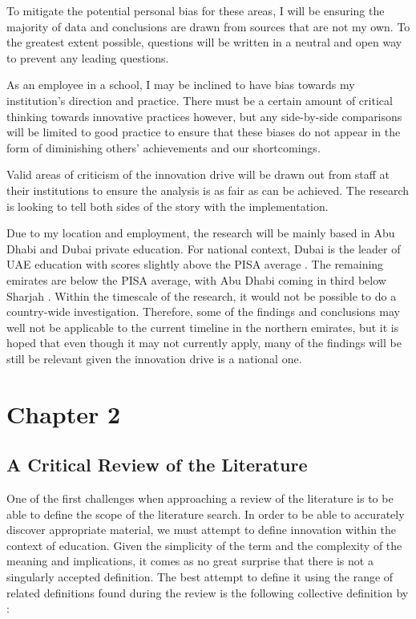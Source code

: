 \documentclass[11pt]{article}
\begin{document}
To mitigate the potential personal bias for these areas, I will be ensuring the majority of data and conclusions are drawn from sources that are not my own. To the greatest extent possible, questions will be written in a neutral and open way to prevent any leading questions.

As an employee in a school, I may be inclined to have bias towards my institution's direction and practice. There must be a certain amount of critical thinking towards innovative practices however, but any side-by-side comparisons will be limited to good practice to ensure that these biases do not appear in the form of diminishing others’ achievements and our shortcomings. 

Valid areas of criticism of the innovation drive will be drawn out from staff at their institutions to ensure the analysis is as fair as can be achieved. The research is looking to tell both sides of the story with the implementation.

Due to my location and employment, the research will be mainly based in Abu Dhabi and Dubai private education. For national context, Dubai is the leader of UAE education with scores slightly above the PISA average \citep{2013}. The remaining emirates are below the PISA average, with Abu Dhabi coming in third below Sharjah \citep{2013}. Within the timescale of the research, it would not be possible to do a country-wide investigation. Therefore, some of the findings and conclusions may well not be applicable to the current timeline in the northern emirates, but it is hoped that even though it may not currently apply, many of the findings will be still be relevant given the innovation drive is a national one.
\section{Chapter 2}
\subsection{A Critical Review of the Literature}
One of the first challenges when approaching a review of the literature is to be able to define the scope of the literature search. In order to be able to accurately discover appropriate material, we must attempt to define innovation within the context of education. Given the simplicity of the term and the complexity of the meaning and implications, it comes as no great surprise that there is not a singularly accepted definition. The best attempt to define it using the range of related definitions found during the review is the following collective definition by \citet{Sharma_2005}:
\end{document}
